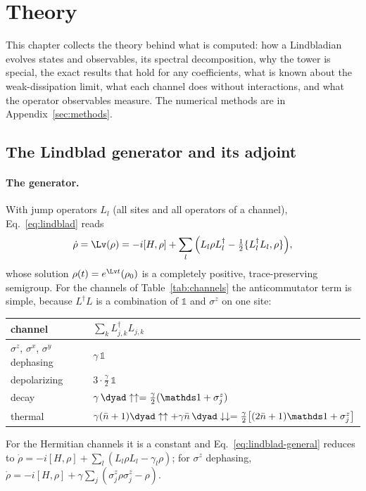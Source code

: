\section{Theory}
\label{sec:theory}

This chapter collects the theory behind what is computed: how a Lindbladian evolves states and observables, its spectral decomposition, why the tower is special, the exact results that hold for any coefficients, what is known about the weak-dissipation limit, what each channel does without interactions, and what the operator observables measure. The numerical methods are in Appendix~\ref{sec:methods}.

\subsection{The Lindblad generator and its adjoint}
\label{sec:forward-backward}

\paragraph{The generator.} With jump operators $L_l$ (all sites and all operators of a channel), Eq.~\eqref{eq:lindblad} reads
\begin{equation}
\dot\rho = \Lv(\rho) = -i[H,\rho] + \sum_l\Big(L_l\rho L_l^\dagger - \tfrac12\{L_l^\dagger L_l, \rho\}\Big),
\label{eq:lindblad-general}
\end{equation}
whose solution $\rho(t) = e^{\Lv t}(\rho_0)$ is a completely positive, trace-preserving semigroup. For the channels of Table~\ref{tab:channels} the anticommutator term is simple, because $L^\dagger L$ is a combination of $\mathds 1$ and $\sigma^z$ on one site:
\begin{center}
\small
\begin{tabular}{ll}
\toprule
channel & $\sum_k L_{j,k}^\dagger L_{j,k}$ \\
\midrule
$\sigma^z$, $\sigma^x$, $\sigma^y$ dephasing & $\gamma\,\mathds 1$ \\
depolarizing & $3\cdot\tfrac\gamma2\,\mathds 1$ \\
decay & $\gamma\,\dyad\uparrow\uparrow = \tfrac\gamma2(\mathds 1 + \sigma^z_j)$ \\
thermal & $\gamma(\bar n+1)\dyad\uparrow\uparrow + \gamma\bar n\,\dyad\downarrow\downarrow = \tfrac\gamma2\big[(2\bar n+1)\mathds 1 + \sigma^z_j\big]$ \\
\bottomrule
\end{tabular}
\end{center}
For the Hermitian channels it is a constant and Eq.~\eqref{eq:lindblad-general} reduces to $\dot\rho = -i[H,\rho] + \sum_l(L_l\rho L_l - \gamma_l\rho)$; for $\sigma^z$ dephasing, $\dot\rho = -i[H,\rho] + \gamma\sum_j(\sigma^z_j\rho\sigma^z_j - \rho)$.

